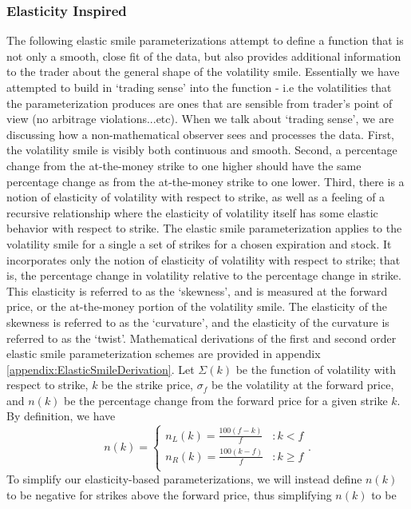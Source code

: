 \documentclass[12pt, a4paper, notitlepage]{article}
\numberwithin{equation}{subsection}
\numberwithin{figure}{subsection}
\numberwithin{table}{subsection}
\newcommand{\newpar}{\newline \newline}
\begin{document}
\subsubsection{Elasticity Inspired}\label{subsec:ElasticityParameterizations}
The following elastic smile parameterizations attempt to define a function that is not only a smooth, close fit of the data, but also provides additional information to the trader about the general shape of the volatility smile.  Essentially we have attempted to build in `trading sense' into the function - i.e the volatilities that the parameterization produces are ones that are sensible from trader's point of view (no arbitrage violations...etc).
\newpar
When we talk about `trading sense', we are discussing how a non-mathematical observer sees and processes the data.  First, the volatility smile is visibly both continuous and smooth.  Second, a percentage change from the at-the-money strike to one higher should have the same percentage change as from the at-the-money strike to one lower.  Third, there is a notion of elasticity of volatility with respect to strike, as well as a feeling of a recursive relationship where the elasticity of volatility itself has some elastic behavior with respect to strike.
\newpar
The elastic smile parameterization applies to the volatility smile for a single a set of strikes for a chosen expiration and stock.  It incorporates only the notion of elasticity of volatility with respect to strike; that is, the percentage change in volatility relative to the percentage change in strike.  This elasticity is referred to as the `skewness', and is measured at the forward price, or the at-the-money portion of the volatility smile.  The elasticity of the skewness is referred to as the `curvature', and the elasticity of the curvature is referred to as the `twist'.  Mathematical derivations of the first and second order elastic smile parameterization schemes are provided in appendix \ref{appendix:ElasticSmileDerivation}.
\newpar
Let $\Sigma(k)$ be the function of volatility with respect to strike, $k$ be the strike price, $\sigma_f$ be the volatility at the forward price, and $n(k)$ be the percentage change from the forward price for a given strike $k$.  By definition, we have
\begin{equation*}
n(k) = 	\begin{cases}
			n_L(k) = \frac{100\left(f-k\right)}{f} & : k < f\\
            n_R(k) = \frac{100\left(k-f\right)}{f} & : k \geq f\\
		\end{cases}.
\end{equation*}
To simplify our elasticity-based parameterizations, we will instead define $n(k)$ to be negative for strikes above the forward price, thus simplifying $n(k)$ to be
\end{document}
